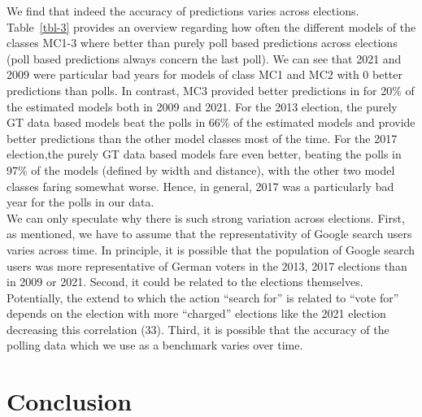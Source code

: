 \documentclass[
  letterpaper,
  DIV=11,
  numbers=noendperiod]{scrartcl}
\begin{document}
We find that indeed the accuracy of predictions varies across elections.
Table~\ref{tbl-3} provides an overview regarding how often the different
models of the classes MC1-3 where better than purely poll based
predictions across elections (poll based predictions always concern the
last poll). We can see that 2021 and 2009 were particular bad years for
models of class MC1 and MC2 with 0 better predictions than polls. In
contrast, MC3 provided better predictions in for 20\% of the estimated
models both in 2009 and 2021. For the 2013 election, the purely GT data
based models beat the polls in 66\% of the estimated models and provide
better predictions than the other model classes most of the time. For
the 2017 election,the purely GT data based models fare even better,
beating the polls in 97\% of the models (defined by width and distance),
with the other two model classes faring somewhat worse. Hence, in
general, 2017 was a particularly bad year for the polls in our data.\\
We can only speculate why there is such strong variation across
elections. First, as mentioned, we have to assume that the
representativity of Google search users varies across time. In
principle, it is possible that the population of Google search users was
more representative of German voters in the 2013, 2017 elections than in
2009 or 2021. Second, it could be related to the elections themselves.
Potentially, the extend to which the action ``search for'' is related to
``vote for'' depends on the election with more ``charged'' elections
like the 2021 election decreasing this correlation (33). Third, it is
possible that the accuracy of the polling data which we use as a
benchmark varies over time.

\hypertarget{conclusion}{%
\section{Conclusion}\label{conclusion}}
\end{document}
